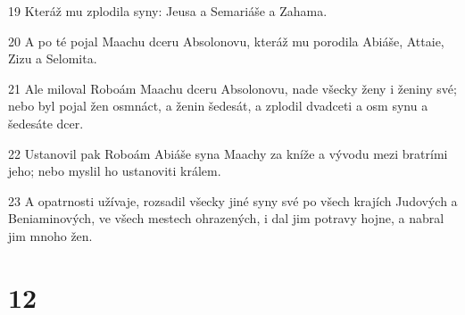 \par 19 Kteráž mu zplodila syny: Jeusa a Semariáše a Zahama.
\par 20 A po té pojal Maachu dceru Absolonovu, kteráž mu porodila Abiáše, Attaie, Zizu a Selomita.
\par 21 Ale miloval Roboám Maachu dceru Absolonovu, nade všecky ženy i ženiny své; nebo byl pojal žen osmnáct, a ženin šedesát, a zplodil dvadceti a osm synu a šedesáte dcer.
\par 22 Ustanovil pak Roboám Abiáše syna Maachy za kníže a vývodu mezi bratrími jeho; nebo myslil ho ustanoviti králem.
\par 23 A opatrnosti užívaje, rozsadil všecky jiné syny své po všech krajích Judových a Beniaminových, ve všech mestech ohrazených, i dal jim potravy hojne, a nabral jim mnoho žen.

\chapter{12}

